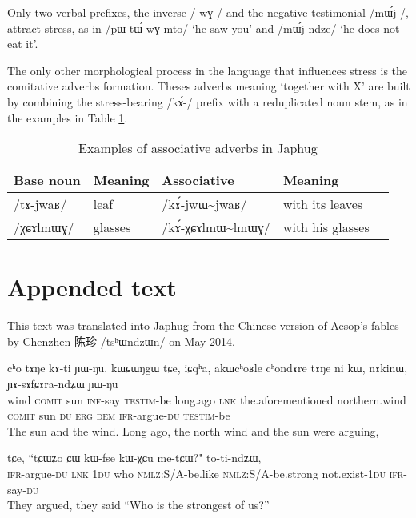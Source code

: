 \documentclass[oneside,a4paper,11pt]{article}
\newcommand{\ipa}[1]{\mbox{\phon/#1/}}
\newcommand{\ipab}[1]{{\phon#1}}
\newcommand{\zh}[1]{{\cn #1}}
\newcommand{\tld}{\textasciitilde{}}
\begin{document}
Only two verbal prefixes, the inverse \ipa{-wɣ-} and the negative testimonial \ipa{mɯ́j-}, attract stress, as in \ipa{pɯ-tɯ́-wɣ-mto} `he saw you' and \ipa{mɯ́j-ndze} `he does not eat it'.
    
The only other morphological process in the language that influences stress is the comitative adverbs formation. Theses adverbs meaning `together with X' are built by combining the stress-bearing \ipa{kɤ́-}  prefix with a reduplicated noun stem, as in the examples in Table \ref{tab:assoc.adv}.

\begin{table}
 \caption{Examples of associative adverbs in Japhug} \label{tab:assoc.adv}  \centering
\begin{tabular}{lllll}
\toprule
Base noun & Meaning & Associative & Meaning \\
\midrule
\ipa{tɤ-jwaʁ} & leaf & \ipa{kɤ́-jwɯ\tld{}jwaʁ} & with its leaves\\
\ipa{χɕɤlmɯɣ} & glasses & \ipa{kɤ́-χɕɤlmɯ\tld{}lmɯɣ} & with his glasses\\
\bottomrule
\end{tabular}
\end{table}
    
    
     \section*{Appended text}
     
   This text was translated into Japhug from the Chinese version of Aesop's fables by Chenzhen \zh{陈珍} \ipa{tsʰɯndzɯn} on May 2014. 
   
     \begin{exe} 
 \ex 
\gll  \ipab{qale} \ipab{cʰo} \ipab{tɤŋe} \ipab{kɤ-ti} \ipab{ɲɯ-ŋu.} \ipab{kɯɕɯŋgɯ} \ipab{tɕe,} \ipab{iɕqʰa,} \ipab{akɯcʰoʁle}   \ipab{cʰondɤre} \ipab{tɤŋe} \ipab{ni} \ipab{kɯ,} \ipab{nɤkinɯ,} \ipab{ɲɤ-sɤfɕɤra-ndʑɯ} \ipab{ɲɯ-ŋu} \\ 
 wind \textsc{comit} sun    \textsc{inf}-say \textsc{testim}-be   long.ago     \textsc{lnk}  the.aforementioned northern.wind  \textsc{comit}     sun    \textsc{du}  \textsc{erg} \textsc{dem} \textsc{ifr}-argue-\textsc{du}    \textsc{testim}-be\\ 
 \glt  The sun and the wind. Long ago, the north wind and the sun were arguing,
\end{exe} 

 

\begin{exe} 
 \ex 
\gll  \ipab{ɲɤ-sɤfɕɤra-ndʑɯ} \ipab{tɕe,} \ipab{``tɕɯʑo} \ipab{ɕɯ} \ipab{kɯ-fse} \ipab{kɯ-χɕu} \ipab{me-tɕɯ?"} \ipab{to-ti-ndʑɯ,} \\ 
 \textsc{ifr}-argue-\textsc{du}    \textsc{lnk}  1\textsc{du}     who \textsc{nmlz}:S/A-be.like \textsc{nmlz}:S/A-be.strong not.exist-1\textsc{du}  \textsc{ifr}-say-\textsc{du}\\ 
 \glt  They argued, they said ``Who is the strongest of us?''
\end{exe} 
\end{document}
